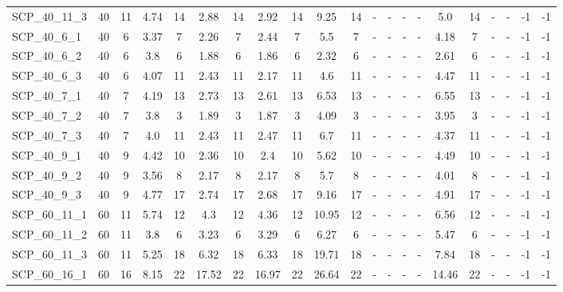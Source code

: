\begin{sidewaystable}[!ht]
{\begin{tabular}{lcccccccccccccccccccc}
SCP\_40\_11\_3 & 40 & 11 & 4.74 & 14 &  \textcolor{blue2}{2.88} & 14 & 2.92 & 14 & 9.25 & 14 &  - &  - &  - &  - & 5.0 & 14 &  - &  - & -1 & -1 \\
SCP\_40\_6\_1 & 40 & 6 & 3.37 & 7 &  \textcolor{blue2}{2.26} & 7 & 2.44 & 7 & 5.5 & 7 &  - &  - &  - &  - & 4.18 & 7 &  - &  - & -1 & -1 \\
SCP\_40\_6\_2 & 40 & 6 & 3.8 & 6 & 1.88 & 6 &  \textcolor{blue2}{1.86} & 6 & 2.32 & 6 &  - &  - &  - &  - & 2.61 & 6 &  - &  - & -1 & -1 \\
SCP\_40\_6\_3 & 40 & 6 & 4.07 & 11 & 2.43 & 11 &  \textcolor{blue2}{2.17} & 11 & 4.6 & 11 &  - &  - &  - &  - & 4.47 & 11 &  - &  - & -1 & -1 \\
SCP\_40\_7\_1 & 40 & 7 & 4.19 & 13 & 2.73 & 13 &  \textcolor{blue2}{2.61} & 13 & 6.53 & 13 &  - &  - &  - &  - & 6.55 & 13 &  - &  - & -1 & -1 \\
SCP\_40\_7\_2 & 40 & 7 & 3.8 & 3 & 1.89 & 3 &  \textcolor{blue2}{1.87} & 3 & 4.09 & 3 &  - &  - &  - &  - & 3.95 & 3 &  - &  - & -1 & -1 \\
SCP\_40\_7\_3 & 40 & 7 & 4.0 & 11 &  \textcolor{blue2}{2.43} & 11 & 2.47 & 11 & 6.7 & 11 &  - &  - &  - &  - & 4.37 & 11 &  - &  - & -1 & -1 \\
SCP\_40\_9\_1 & 40 & 9 & 4.42 & 10 &  \textcolor{blue2}{2.36} & 10 & 2.4 & 10 & 5.62 & 10 &  - &  - &  - &  - & 4.49 & 10 &  - &  - & -1 & -1 \\
SCP\_40\_9\_2 & 40 & 9 & 3.56 & 8 &  \textcolor{blue2}{2.17} & 8 &  \textcolor{blue2}{2.17} & 8 & 5.7 & 8 &  - &  - &  - &  - & 4.01 & 8 &  - &  - & -1 & -1 \\
SCP\_40\_9\_3 & 40 & 9 & 4.77 & 17 & 2.74 & 17 &  \textcolor{blue2}{2.68} & 17 & 9.16 & 17 &  - &  - &  - &  - & 4.91 & 17 &  - &  - & -1 & -1 \\
SCP\_60\_11\_1 & 60 & 11 & 5.74 & 12 &  \textcolor{blue2}{4.3} & 12 & 4.36 & 12 & 10.95 & 12 &  - &  - &  - &  - & 6.56 & 12 &  - &  - & -1 & -1 \\
SCP\_60\_11\_2 & 60 & 11 & 3.8 & 6 &  \textcolor{blue2}{3.23} & 6 & 3.29 & 6 & 6.27 & 6 &  - &  - &  - &  - & 5.47 & 6 &  - &  - & -1 & -1 \\
SCP\_60\_11\_3 & 60 & 11 &  \textcolor{blue2}{5.25} & 18 & 6.32 & 18 & 6.33 & 18 & 19.71 & 18 &  - &  - &  - &  - & 7.84 & 18 &  - &  - & -1 & -1 \\
SCP\_60\_16\_1 & 60 & 16 &  \textcolor{blue2}{8.15} & 22 & 17.52 & 22 & 16.97 & 22 & 26.64 & 22 &  - &  - &  - &  - & 14.46 & 22 &  - &  - & -1 & -1 \\

\end{tabular}}
\end{sidewaystable}
